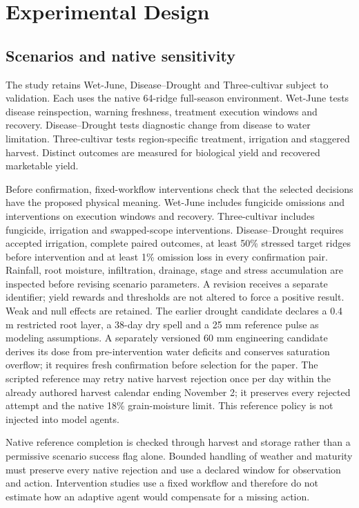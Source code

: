 \documentclass[sigconf,anonymous]{aamas}
\begin{document}
\section{Experimental Design}
\subsection{Scenarios and native sensitivity}
The study retains Wet-June, Disease--Drought and Three-cultivar subject to validation. Each uses the native 64-ridge full-season environment. Wet-June tests disease reinspection, warning freshness, treatment execution windows and recovery. Disease--Drought tests diagnostic change from disease to water limitation. Three-cultivar tests region-specific treatment, irrigation and staggered harvest. Distinct outcomes are measured for biological yield and recovered marketable yield.

Before confirmation, fixed-workflow interventions check that the selected decisions have the proposed physical meaning. Wet-June includes fungicide omissions and interventions on execution windows and recovery. Three-cultivar includes fungicide, irrigation and swapped-scope interventions. Disease--Drought requires accepted irrigation, complete paired outcomes, at least 50\% stressed target ridges before intervention and at least 1\% omission loss in every confirmation pair. Rainfall, root moisture, infiltration, drainage, stage and stress accumulation are inspected before revising scenario parameters. A revision receives a separate identifier; yield rewards and thresholds are not altered to force a positive result. Weak and null effects are retained. The earlier drought candidate declares a 0.4 m restricted root layer, a 38-day dry spell and a 25 mm reference pulse as modeling assumptions. A separately versioned 60 mm engineering candidate derives its dose from pre-intervention water deficits and conserves saturation overflow; it requires fresh confirmation before selection for the paper. The scripted reference may retry native harvest rejection once per day within the already authored harvest calendar ending November 2; it preserves every rejected attempt and the native 18\% grain-moisture limit. This reference policy is not injected into model agents.

Native reference completion is checked through harvest and storage rather than a permissive scenario success flag alone. Bounded handling of weather and maturity must preserve every native rejection and use a declared window for observation and action. Intervention studies use a fixed workflow and therefore do not estimate how an adaptive agent would compensate for a missing action.
\end{document}
